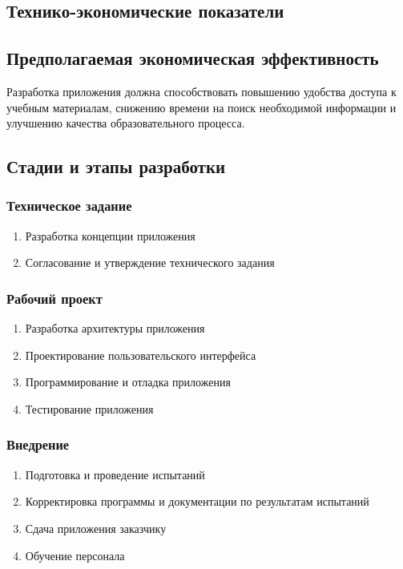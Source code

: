 \documentclass[a4paper,12pt]{article}
\begin{document}
\subsection{Технико-экономические показатели}
\subsection{Предполагаемая экономическая эффективность}
Разработка приложения должна способствовать повышению удобства доступа к учебным материалам, снижению времени на поиск необходимой информации и улучшению качества образовательного процесса.

\subsection{Стадии и этапы разработки}
\subsubsection{Техническое задание}
\begin{enumerate}
  \item Разработка концепции приложения
  \item Согласование и утверждение технического задания
\end{enumerate}
\subsubsection{Рабочий проект}
\begin{enumerate}
  \item Разработка архитектуры приложения
  \item Проектирование пользовательского интерфейса
  \item Программирование и отладка приложения
  \item Тестирование приложения
\end{enumerate}
\subsubsection{Внедрение}
\begin{enumerate}
  \item Подготовка и проведение испытаний
  \item Корректировка программы и документации по результатам испытаний
  \item Сдача приложения заказчику
  \item Обучение персонала
\end{enumerate}
\end{document}
